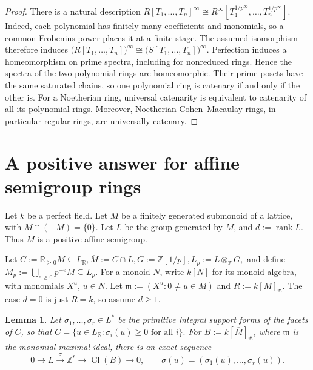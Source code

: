 \documentclass[11pt,a4paper]{amsart}
\numberwithin{equation}{section}
\newtheorem{lemma}[theorem]{Lemma}
\newcommand{\Cl}{\operatorname{Cl}}
\newcommand{\ZZ}{\mathbb Z}
\newcommand{\RR}{\mathbb R}
\begin{document}
 \begin{proof}	There is a natural description	$R[T_1,\ldots,T_n]^\infty
\cong R^\infty[T_1^{1/p^\infty},\ldots,T_n^{1/p^\infty}].$	Indeed, each polynomial has finitely many coefficients and monomials,
so a common Frobenius power places it at a finite stage. The assumed	isomorphism therefore induces
$\bigl(R[T_1,\ldots,T_n]\bigr)^\infty
 	\cong
\bigl(S[T_1,\ldots,T_n]\bigr)^\infty.$	Perfection induces a homeomorphism on prime spectra, including for	nonreduced rings. Hence the spectra of the two polynomial rings are 	homeomorphic. Their prime posets have the same saturated chains, so	one polynomial ring is catenary if and only if the other is.	For a Noetherian ring, universal catenarity is equivalent to	catenarity of all its polynomial rings. Moreover, Noetherian	Cohen--Macaulay rings, in particular regular rings, are universally 	catenary.
 \end{proof}
 


 

 
 
 
 \section{A positive answer for affine semigroup rings}
 
 Let $k$ be a perfect field. Let $M$ be a finitely generated
 submonoid of a lattice, with $ M\cap(-M)=\{0\}$. Let $L$ be the group generated by $M$, and
 $ d:=\operatorname{rank}L. $ 
 Thus $M$ is a positive affine semigroup. 
 \begin{notation}
 Let $C:=\RR_{\geq0}M\subseteq L_{\RR}, 
 \overline M:=C\cap L, 
 G:=\ZZ[1/p], L_p:=L\otimes_{\ZZ}G,$ and define
 $ M_p:=\bigcup_{e\geq0}p^{-e}M\subseteq L_p.$ For a monoid $N$, write $k[N]$ for its monoid algebra, with
 monomials $X^u$, $u\in N$. Let
 $\mathfrak m:=(X^u:0\neq u\in M)$ and $ R:=k[M]_{\mathfrak m}.$
 The case $d=0$ is just $R=k$, so assume $d\geq1$.
 \end{notation} 
 
 
 \begin{lemma}\label{lem:class}
 Let $\sigma_1,\ldots,\sigma_r\in L^*$ be the primitive integral	support forms of the facets of $C$, so that
 $	C=\{u\in L_{\RR}:\sigma_i(u)\geq0\text{ for all }i\}.$
 For $B:=k[\overline M]_{\overline{\mathfrak m}}$, where
 $\overline{\mathfrak m}$ is the monomial maximal ideal, there is	an exact sequence	$$	0\longrightarrow L
 	\xrightarrow{\ \sigma\ }\ZZ^r
 	\longrightarrow\Cl(B)\longrightarrow0,
 	\qquad
 	\sigma(u)=(\sigma_1(u),\ldots,\sigma_r(u)).$$
 \end{lemma}
 
\end{document}
